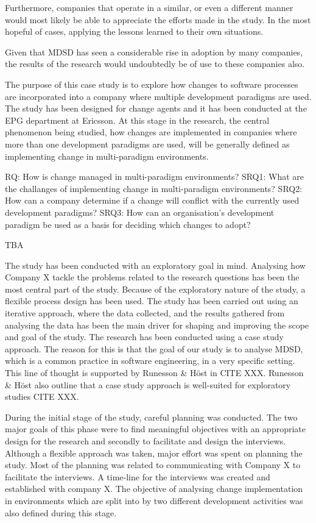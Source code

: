 \documentclass[times, 10pt,twocolumn]{Article}
\begin{document}
Furthermore, companies that operate in a similar, or even a different manner would most likely be able to appreciate the efforts made in the study. In the most hopeful of cases, applying the lessons learned to their own situations.

Given that MDSD has seen a considerable rise in adoption by many companies\cite{millermda}, the results of the research would undoubtedly be of use to these companies also.

The purpose of this case study is to explore how changes to software processes are incorporated into a company where multiple development paradigms are used. The study has been designed for change agents and it has been conducted at the EPG department at Ericsson. At this stage in the research, the central phenomenon being studied, how changes are implemented in companies where more than one development paradigms are used, will be generally defined as implementing change in multi-paradigm environments. 


RQ: How is change managed in multi-paradigm environments?
SRQ1: What are the challanges of implementing change in multi-paradigm environments?
SRQ2: How can a company determine if a change will conflict with the currently used development paradigms?
SRQ3: How can an organisation's development paradigm be used as a basis for deciding which changes to adopt? 

TBA



The study has been conducted with an exploratory goal in mind. Analysing how Company X tackle the problems related to the research questions has been the most central part of the study. Because of the exploratory nature of the study, a flexible process design has been used. The study has been carried out using an iterative approach, where the data collected, and the results gathered from analysing the data has been the main driver for shaping and improving the scope and goal of the study. The research has been conducted using a case study approach. The reason for this is that the goal of our study is to analyse MDSD, which is a common practice in software engineering, in a very specific setting. This line of thought is supported by Runesson \& Höst in CITE XXX. Runesson \& Höst also outline that a case study approach is well-suited for exploratory studies CITE XXX. 

During the initial stage of the study, careful planning was conducted. The two major goals of this phase were to find meaningful objectives with an appropriate design for the research and secondly to facilitate and design the interviews. Although a flexible approach was taken, major effort was spent on planning the study. Most of the planning was related to communicating with Company X to facilitate the interviews. A time-line for the interviews was created and established with company X. The objective of analysing change implementation in environments which are split into by two different development activities was also defined during this stage. 
\end{document}
